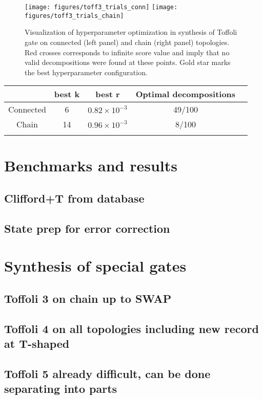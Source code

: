 \documentclass[amsfonts, amssymb, aps, nofootinbib]{revtex4-2}
\begin{document}
\begin{figure}
\texttt{[image: figures/toff3\_trials\_conn]}
\texttt{[image: figures/toff3\_trials\_chain]}
\caption{Visualization of hyperparameter optimization in synthesis of Toffoli gate on connected (left panel) and chain (right panel) topologies. Red crosses corresponds to infinite score value and imply that no valid decompositions were found at these points. Gold star marks the best hyperparameter configuration.}
\label{fig trials}	
\end{figure}
\begin{table}[]
	\begin{tabular}{@{}ccccc@{}}
		\toprule
		& best k & best r              & Optimal decompositions &  \\ \midrule
		Connected & 6      & $0.82\times10^{-3}$ & 49/100                 &  \\
		Chain     & 14     & $0.96\times10^{-3}$ & 8/100                  &  \\
		&        &                     &                        &  \\ \bottomrule
	\end{tabular}
\label{tab toff3}
\end{table}


\section{Benchmarks and results}
\subsection{Clifford+T from database}
\subsection{State prep for error correction}
\section{Synthesis of special gates}
\subsection{Toffoli 3 on chain up to SWAP}
\subsection{Toffoli 4 on all topologies including new record at T-shaped}
\subsection{Toffoli 5 already difficult, can be done separating into parts}


\end{document}
